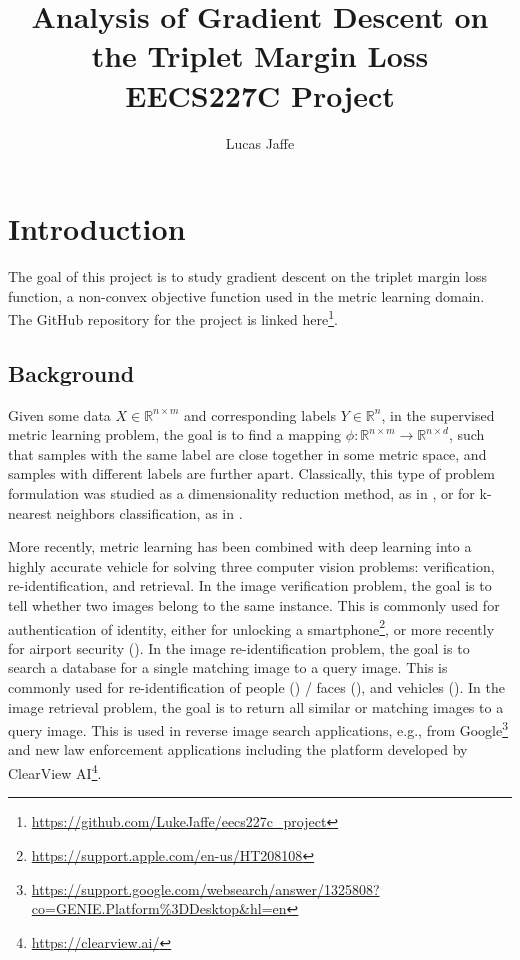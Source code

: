 \documentclass[11pt]{article}
\begin{document}
\author{Lucas Jaffe}

\title{
    Analysis of Gradient Descent on the Triplet Margin Loss \\
    \large EECS227C Project
    }
\maketitle

\medskip

\section{Introduction}

The goal of this project is to study gradient descent on the triplet margin loss function, a non-convex objective function used in the metric learning domain. The GitHub repository for the project is linked here\footnote{\url{https://github.com/LukeJaffe/eecs227c_project}}.

\subsection{Background}
 
 Given some data $X \in \mathbb{R}^{n \times m}$ and corresponding labels $Y \in \mathbb{R}^n$, in the supervised metric learning problem, the goal is to find a mapping $\phi: \mathbb{R}^{n \times m} \rightarrow \mathbb{R}^{n \times d}$, such that samples with the same label are close together in some metric space, and samples with different labels are further apart. Classically, this type of problem formulation was studied as a dimensionality reduction method, as in \cite{hadsell_dimensionality_2006}, or for k-nearest neighbors classification, as in \cite{weinberger_distance_2009}. 

More recently, metric learning has been combined with deep learning into a highly accurate vehicle for solving three computer vision problems: verification, re-identification, and retrieval. In the image verification problem, the goal is to tell whether two images belong to the same instance. This is commonly used for authentication of identity, either for unlocking a smartphone\footnote{\url{https://support.apple.com/en-us/HT208108}}, or more recently for airport security (\cite{mccartney_are_2019}). In the image re-identification problem, the goal is to search a database for a single matching image to a query image. This is commonly used for re-identification of people (\cite{zheng_scalable_2015}) / faces (\cite{schroff_facenet_2015}), and vehicles (\cite{liu_deep_2016}). In the image retrieval problem, the goal is to return all similar or matching images to a query image. This is used in reverse image search applications, e.g., from Google\footnote{\url{https://support.google.com/websearch/answer/1325808?co=GENIE.Platform\%3DDesktop&hl=en}} and new law enforcement applications including the platform developed by ClearView AI\footnote{\url{https://clearview.ai/}}.
\end{document}
